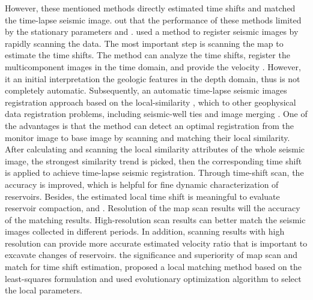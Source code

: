 However,  these mentioned methods directly estimated time shifts and matched the time-lapse seismic image.   \cite{ayeni2009optimized}  out that the performance of these methods  limited by the stationary parameters and . 
\cite{fomel2005a} used a  method to register seismic images by rapidly scanning the data.  The most important step is scanning the map to estimate the time shifts. The method can analyze the time shifts,  register the multicomponent images in the time domain, and provide the velocity . However, it  an initial interpretation  the geologic features in the depth domain, thus is not completely automatic.
Subsequently, \cite{fomel20094}  an automatic time-lapse seismic images registration approach based on the local-similarity \cite[]{fomel2007local, yangkang2015ortho}, which  to other geophysical data registration problems, including seismic-well ties \cite[]{bader2019missing} and image merging \cite[]{greer2018matching}. 
One of the advantages is that the method can detect an optimal registration from the monitor image to  base image by scanning and matching their local similarity.  After calculating and scanning the local similarity attributes of the whole seismic image, the strongest similarity trend is picked, then the corresponding time shift is applied to achieve time-lapse seismic  registration. 
Through time-shift scan, the accuracy  is improved, which is helpful for fine dynamic characterization of reservoirs.
Besides, the estimated local time shift is meaningful to evaluate reservoir compaction, and .
Resolution of the map scan results will  the accuracy of the matching results. High-resolution scan results can better match the seismic images collected in different periods. 
In addition, scanning results with high resolution can provide  more accurate estimated velocity ratio that is important to excavate changes of reservoirs.
\cite{ayeni2009optimized}  the significance and superiority of map scan and match for time shift estimation, proposed a local matching method based on the least-squares formulation\wen{,} and used  evolutionary optimization algorithm to select the local parameters.
